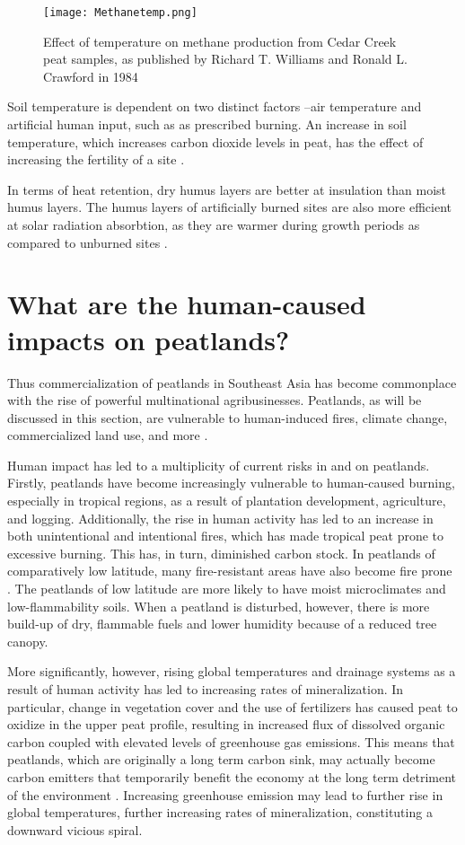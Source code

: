 \begin{figure}
  \texttt{[image: Methanetemp.png]}
  \caption{Effect of temperature on methane production from Cedar Creek peat samples, as published by Richard T. Williams and Ronald L. Crawford in 1984}
  \label{fig:soiltemperature}
\end{figure}

Soil temperature is dependent on two distinct factors --air temperature and artificial human input, such as as prescribed burning. An increase in soil temperature, which increases carbon dioxide levels in peat, has the effect of increasing the fertility of a site \citep{kozlowski2012fire}.

In terms of heat retention, dry humus layers are better at insulation than moist humus layers. The humus layers of artificially burned sites are also more efficient at solar radiation absorbtion, as they are warmer during growth periods as compared to unburned sites \citep{kozlowski2012fire}.

\section{What are the human-caused impacts on peatlands?}

Thus commercialization of peatlands in Southeast Asia has become commonplace with the rise of powerful multinational agribusinesses. Peatlands, as will be discussed in this section, are vulnerable to human-induced fires, climate change, commercialized land use, and more \citep{turetsky2015global}. 

Human impact has led to a multiplicity of current risks in and on peatlands. Firstly, peatlands have become increasingly vulnerable to human-caused burning, especially in tropical regions, as a result of plantation development, agriculture, and logging. Additionally, the rise in human activity has led to an increase in both unintentional and intentional fires, which has made tropical peat prone to excessive burning. This has, in turn, diminished carbon stock. In peatlands of comparatively low latitude, many fire-resistant areas have also become fire prone \citep{turetsky2015global}. The peatlands of low latitude are more likely to have moist microclimates and low-flammability soils. When a peatland is disturbed, however, there is more build-up of dry, flammable fuels and lower humidity because of a reduced tree canopy. 

More significantly, however, rising global temperatures and drainage systems as a result of human activity has led to increasing rates of mineralization. In particular, change in vegetation cover and the use of fertilizers has caused peat to oxidize in the upper peat profile, resulting in increased flux of dissolved organic carbon coupled with elevated levels of greenhouse gas emissions. This means that peatlands, which are originally a long term carbon sink, may actually become carbon emitters that temporarily benefit the economy at the long term detriment of the environment \citep{turetsky2015global}. Increasing greenhouse emission may lead to further rise in global temperatures, further increasing rates of mineralization, constituting a downward vicious spiral.

